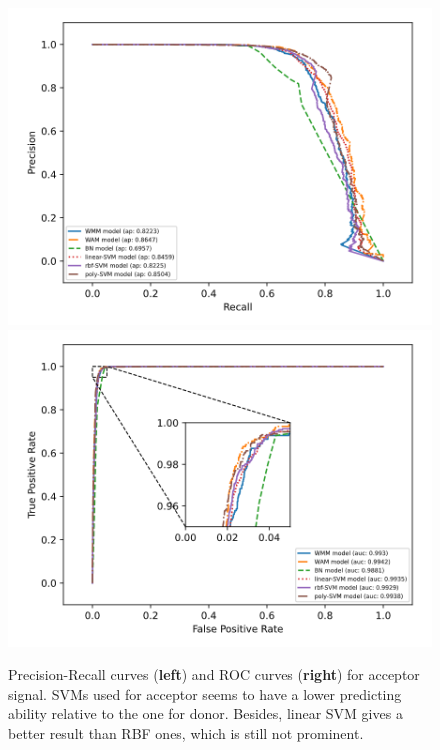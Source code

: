 \documentclass[journal,twoside]{IEEEtran}
\begin{document}
\begin{figure}[htbp]
\centerline{\includegraphics[scale=0.28]{Pics/all_prcurve_acceptor.png}
    \includegraphics[scale=0.28]{Pics/all_roccurve_acceptor.png}}
\caption{Precision-Recall curves (\textbf{left}) and ROC curves (\textbf{right}) for acceptor signal. SVMs used for acceptor seems to have a lower predicting ability relative to the one for donor. Besides, linear SVM gives a better result than RBF ones, which is still not prominent. }
\label{fig6}
\end{figure}
\end{document}
